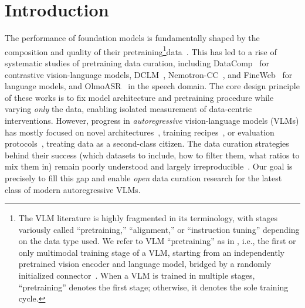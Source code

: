 
\section{Introduction}\label{sec:intro}




The performance of foundation models is fundamentally shaped by the composition and quality of their pretraining\footnote{The VLM literature is highly fragmented in its terminology, with stages variously called ``pretraining,'' ``alignment,'' or ``instruction tuning'' depending on the data type used. We refer to VLM ``pretraining'' as in \cite{chen2024expanding,zhu2025internvl3,wang2025internvl3}, i.e., the first or only multimodal training stage of a VLM, starting from an independently pretrained vision encoder and language model, bridged by a randomly initialized connector~\citep{liu2023visual}. When a VLM is trained in multiple stages, ``pretraining'' denotes the first stage; otherwise, it denotes the sole training cycle.}data~\citep{gadre2023datacomp,li2024datacomp,grattafiori2024llama,penedo2024fineweb,nguyen2022quality,fang2022data,udandarao2025data,ghosh2025concept,penedo2023refinedweb,schuhmann2022laion}.
This has led to a rise of systematic studies of pretraining data curation, including 
DataComp~\citep{gadre2023datacomp} for contrastive vision-language models, DCLM~\citep{li2024datacomp}, Nemotron-CC~\citep{su2025nemotron}, and FineWeb~\citep{penedo2024fineweb} for language models, and OlmoASR~\citep{ngo2025olmoasr} in the speech domain.
The core design principle of these works is to fix model architecture and pretraining procedure while varying \emph{only} the data, enabling isolated measurement of data-centric interventions. 
However, progress in \emph{autoregressive} vision-language models (VLMs) has mostly focused on novel  architectures~\citep{deitke2025molmo,xu2025qwen3,hong2025glm,gemmateam2025gemma3technicalreport,coreteam2025mimovltechnicalreport,deshmukh2025nvidia,yang2025kwai,wu2024deepseek,abouelenin2025phi,bevli2026falcon,beyer2024paligemma}, training recipes~\citep{tong2024cambrian,zhu2025internvl3,wang2025internvl3,an2025llava,cho2025perceptionlm,liu2023visual,liu2024improved,liu2024llavanext,li2025xiaomi,marafioti2025smolvlm,mckinzie2024mm1,guo2025seed1,lu2024deepseek,steiner2024paligemma}, or evaluation protocols~\citep{duan2024vlmevalkit,zhang2025lmms,joshi2026datbench,ghosh2025onebench}, treating data as a second-class citizen. 
The data curation strategies behind their success (which datasets to include, how to filter them, what ratios to mix them in) remain poorly understood and largely irreproducible~\citep{gemmateam2025gemma3technicalreport,mckinzie2024mm1, tong2024cambrian,zhu2025internvl3,wang2025internvl3,an2025llava,cho2025perceptionlm,joshi202620}.
Our goal is precisely to fill this gap and enable \emph{open} data curation research for the latest class of modern autoregressive VLMs.

